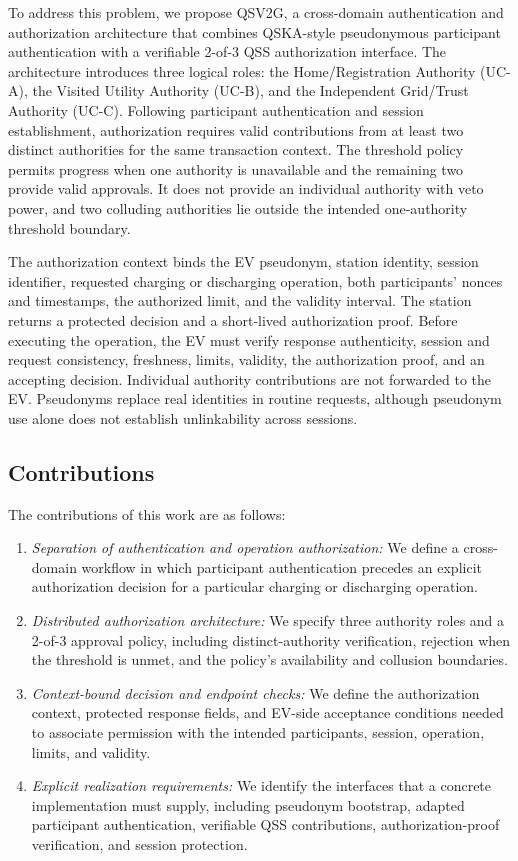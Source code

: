 \documentclass[twocolumn,10pt,journal]{IEEEtran}
\begin{document}
To address this problem, we propose QSV2G, a cross-domain authentication and authorization architecture that combines QSKA-style pseudonymous participant authentication with a verifiable 2-of-3 QSS authorization interface. The architecture introduces three logical roles: the Home/Registration Authority (UC-A), the Visited Utility Authority (UC-B), and the Independent Grid/Trust Authority (UC-C). Following participant authentication and session establishment, authorization requires valid contributions from at least two distinct authorities for the same transaction context. The threshold policy permits progress when one authority is unavailable and the remaining two provide valid approvals. It does not provide an individual authority with veto power, and two colluding authorities lie outside the intended one-authority threshold boundary.

The authorization context binds the EV pseudonym, station identity, session identifier, requested charging or discharging operation, both participants' nonces and timestamps, the authorized limit, and the validity interval. The station returns a protected decision and a short-lived authorization proof. Before executing the operation, the EV must verify response authenticity, session and request consistency, freshness, limits, validity, the authorization proof, and an accepting decision. Individual authority contributions are not forwarded to the EV. Pseudonyms replace real identities in routine requests, although pseudonym use alone does not establish unlinkability across sessions.

\subsection{Contributions}
The contributions of this work are as follows:
\begin{enumerate}
\item \textit{Separation of authentication and operation authorization:} We define a cross-domain workflow in which participant authentication precedes an explicit authorization decision for a particular charging or discharging operation.
\item \textit{Distributed authorization architecture:} We specify three authority roles and a 2-of-3 approval policy, including distinct-authority verification, rejection when the threshold is unmet, and the policy's availability and collusion boundaries.
\item \textit{Context-bound decision and endpoint checks:} We define the authorization context, protected response fields, and EV-side acceptance conditions needed to associate permission with the intended participants, session, operation, limits, and validity.
\item \textit{Explicit realization requirements:} We identify the interfaces that a concrete implementation must supply, including pseudonym bootstrap, adapted participant authentication, verifiable QSS contributions, authorization-proof verification, and session protection.
\end{enumerate}
\end{document}
